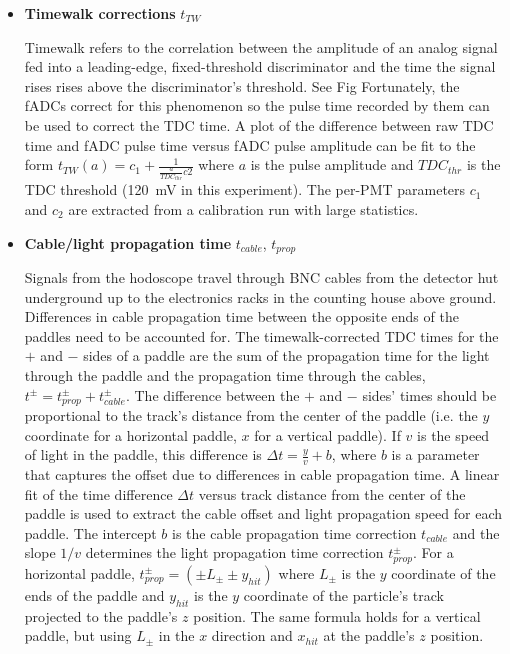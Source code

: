 \begin{itemize}
    \item \textbf{Timewalk corrections} $t_{TW}$

Timewalk refers to the correlation between
the amplitude of an analog signal fed into a leading-edge, fixed-threshold discriminator
and the time the signal rises rises above the discriminator's threshold.
See Fig%
Fortunately, the fADCs correct for this phenomenon so the pulse time recorded
by them can be used to correct the TDC time.
A plot of the difference between raw TDC time and fADC pulse time
versus fADC pulse amplitude can be fit to the form
$t_{TW}(a) = c_1 + \frac{1}{\frac{a}{TDC_{thr}}c2}$
where $a$ is the pulse amplitude and
$TDC_{thr}$ is the TDC threshold (\SI{120}{\milli\volt} in this experiment).
The per-PMT parameters $c_1$ and $c_2$ are extracted from a calibration run
with large statistics.

    \item \textbf{Cable/light propagation time} $t_{cable}$, $t_{prop}$

Signals from the hodoscope travel through BNC cables from the detector hut
underground up to the electronics racks in the counting house above ground.
Differences in cable propagation time between the opposite ends of the paddles
need to be accounted for.
The timewalk-corrected TDC times for the $+$ and $-$ sides of a paddle are
the sum of the propagation time for the light through the paddle
and the propagation time through the cables,
$t^{\pm}=t^{\pm}_{prop}+t^{\pm}_{cable}$.
The difference between the $+$ and $-$ sides' times should be proportional to
the track's distance from the center of the paddle
(i.e. the $y$ coordinate for a horizontal paddle, $x$ for a vertical paddle).
If $v$ is the speed of light in the paddle, this difference is
$\Delta t = \frac{y}{v} + b$,
where $b$ is a parameter that captures the offset due to differences in cable
propagation time.
A linear fit of the time difference $\Delta t$ versus track distance from the
center of the paddle is used to extract the cable offset and light propagation
speed for each paddle.
The intercept $b$ is the cable propagation time correction $t_{cable}$
and the slope $1/v$ determines the light propagation time correction
$t^\pm_{prop}$.
For a horizontal paddle,
$t^\pm_{prop} = (\pm L_\pm \pm y_{hit})$
where $L_\pm$ is the $y$ coordinate of the ends of the paddle and
$y_{hit}$ is the $y$ coordinate of the particle's track projected to the
paddle's $z$ position.
The same formula holds for a vertical paddle, but using $L_\pm$ in the $x$
direction and $x_{hit}$ at the paddle's $z$ position.


\end{itemize}
